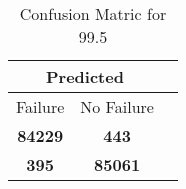 \begin{table}[] 
\caption{Confusion Matric for 99.5} 
\label{Table: Prediction Accuracy-DMD99.5OnlySunEKF-ignoreReflection-Reflection} 
\centering 
\begin{tabular} 
 {@{}ccc@{}} 
\toprule 
\multicolumn{2}{c}{\textbf{Predicted}}
 \\ \midrule 
\multicolumn{1}{|c|}{Failure} & 
\multicolumn{1}{c|}{No Failure}
 \\ \midrule 
\multicolumn{1}{|c|}{\color{green}\textbf{84229}} & 
\multicolumn{1}{c|}{\color{red}\textbf{443}}
 \\ \midrule 
\multicolumn{1}{|c|}{\color{red}\textbf{395}} & 
\multicolumn{1}{c|}{\color{green}\textbf{85061}}
 \\ \bottomrule 
\end{tabular} 
\end{table} 
